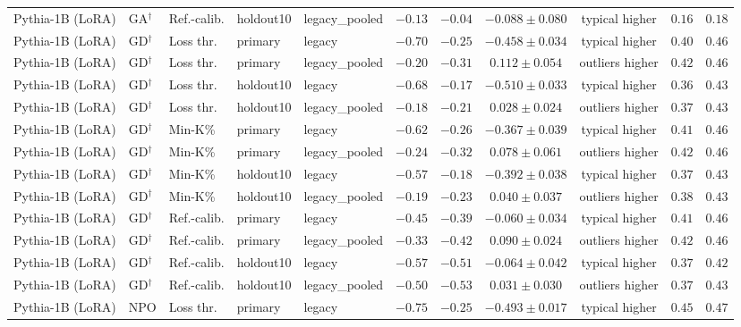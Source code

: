 \begin{table}[t]
\begin{tabular*}{\textwidth}{@{\extracolsep{\fill}}lllllcccccc@{}}
Pythia-1B (LoRA) & GA$^{\dagger}$ & Ref.-calib. & holdout10 & legacy\_pooled & $-0.13$ & $-0.04$ & $-0.088 \pm 0.080$ & typical higher & $0.16$ & $0.18$ \\
Pythia-1B (LoRA) & GD$^{\dagger}$ & Loss thr. & primary & legacy & $-0.70$ & $-0.25$ & $-0.458 \pm 0.034$ & typical higher & $0.40$ & $0.46$ \\
Pythia-1B (LoRA) & GD$^{\dagger}$ & Loss thr. & primary & legacy\_pooled & $-0.20$ & $-0.31$ & $0.112 \pm 0.054$ & outliers higher & $0.42$ & $0.46$ \\
Pythia-1B (LoRA) & GD$^{\dagger}$ & Loss thr. & holdout10 & legacy & $-0.68$ & $-0.17$ & $-0.510 \pm 0.033$ & typical higher & $0.36$ & $0.43$ \\
Pythia-1B (LoRA) & GD$^{\dagger}$ & Loss thr. & holdout10 & legacy\_pooled & $-0.18$ & $-0.21$ & $0.028 \pm 0.024$ & outliers higher & $0.37$ & $0.43$ \\
Pythia-1B (LoRA) & GD$^{\dagger}$ & Min-K\% & primary & legacy & $-0.62$ & $-0.26$ & $-0.367 \pm 0.039$ & typical higher & $0.41$ & $0.46$ \\
Pythia-1B (LoRA) & GD$^{\dagger}$ & Min-K\% & primary & legacy\_pooled & $-0.24$ & $-0.32$ & $0.078 \pm 0.061$ & outliers higher & $0.42$ & $0.46$ \\
Pythia-1B (LoRA) & GD$^{\dagger}$ & Min-K\% & holdout10 & legacy & $-0.57$ & $-0.18$ & $-0.392 \pm 0.038$ & typical higher & $0.37$ & $0.43$ \\
Pythia-1B (LoRA) & GD$^{\dagger}$ & Min-K\% & holdout10 & legacy\_pooled & $-0.19$ & $-0.23$ & $0.040 \pm 0.037$ & outliers higher & $0.38$ & $0.43$ \\
Pythia-1B (LoRA) & GD$^{\dagger}$ & Ref.-calib. & primary & legacy & $-0.45$ & $-0.39$ & $-0.060 \pm 0.034$ & typical higher & $0.41$ & $0.46$ \\
Pythia-1B (LoRA) & GD$^{\dagger}$ & Ref.-calib. & primary & legacy\_pooled & $-0.33$ & $-0.42$ & $0.090 \pm 0.024$ & outliers higher & $0.42$ & $0.46$ \\
Pythia-1B (LoRA) & GD$^{\dagger}$ & Ref.-calib. & holdout10 & legacy & $-0.57$ & $-0.51$ & $-0.064 \pm 0.042$ & typical higher & $0.37$ & $0.42$ \\
Pythia-1B (LoRA) & GD$^{\dagger}$ & Ref.-calib. & holdout10 & legacy\_pooled & $-0.50$ & $-0.53$ & $0.031 \pm 0.030$ & outliers higher & $0.37$ & $0.43$ \\
Pythia-1B (LoRA) & NPO & Loss thr. & primary & legacy & $-0.75$ & $-0.25$ & $-0.493 \pm 0.017$ & typical higher & $0.45$ & $0.47$ \\

\end{tabular*}
\end{table}
